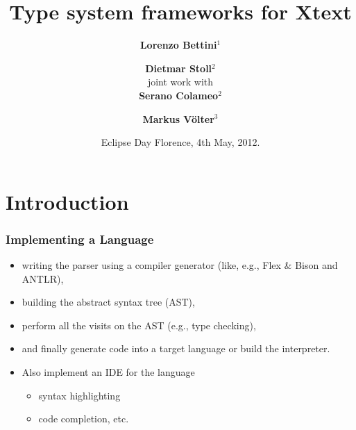 \title{Type system frameworks for Xtext}
\author{\textbf{Lorenzo Bettini}$^1$ \and \textbf{Dietmar Stoll}$^2$\\
joint work with\\
\textbf{Serano Colameo}$^2$ \and \textbf{Markus V\"olter}$^3$}
\date{Eclipse Day Florence, 4th May, 2012.}


\maketitle


\section{Introduction}

\begin{frame}
  \frametitle{Implementing a Language}

  \begin{itemize}
  \item writing the parser using a compiler generator (like, e.g.,
    Flex \& Bison and ANTLR),
  \item building the abstract syntax tree (AST), 
  \item perform all the visits on the AST (e.g., type checking),
  \item and finally generate code into a target language or build the
    interpreter.
  \end{itemize}


\begin{itemize}
\item Also implement an IDE for the language
  \begin{itemize}
  \item syntax highlighting
  \item code completion, etc.
  \end{itemize}

\end{itemize}
\end{frame}






